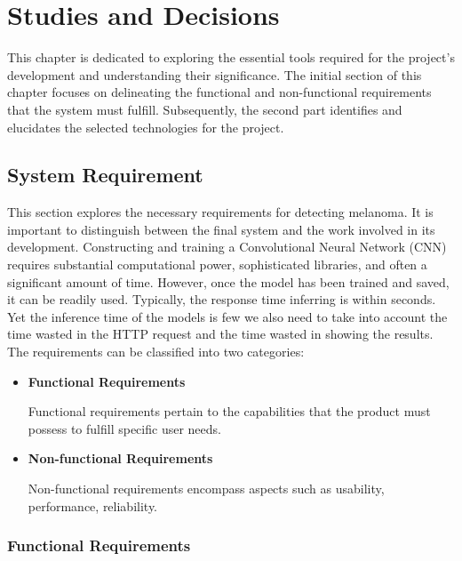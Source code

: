 \chapter{Studies and Decisions} \label{cap:studies_and_decisions}

This chapter is dedicated to exploring the essential tools required for the
project's development and understanding their significance. The initial section
of this chapter focuses on delineating the functional and non-functional
requirements that the system must fulfill. Subsequently, the second part
identifies and elucidates the selected technologies for the project.

\section{System Requirement}

This section explores the necessary requirements for detecting melanoma. It is
important to distinguish between the final system and the work involved in its
development. Constructing and training a Convolutional Neural Network (CNN)
requires substantial computational power, sophisticated libraries, and often a
significant amount of time. However, once the model has been trained and saved,
it can be readily used. Typically, the response time inferring is within
seconds. Yet the inference time of the models is few we also need to take into
account the time wasted in the HTTP request and the time wasted in showing the
results. \\

The requirements can be classified into two categories:

\begin{itemize}
  \item \textbf{Functional Requirements}

    Functional requirements pertain to the capabilities that the product must
    possess to fulfill specific user needs.

  \item \textbf{Non-functional Requirements}

    Non-functional requirements encompass aspects such as usability, performance,
    reliability.

\end{itemize}

\newpage

\subsection{Functional Requirements}

